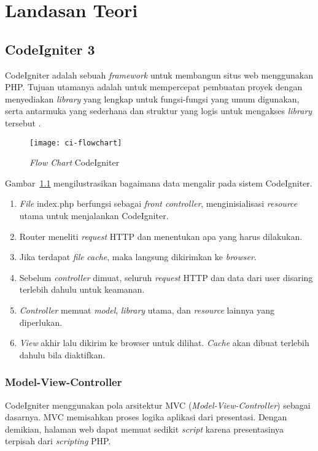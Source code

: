 \chapter{Landasan Teori}
\label{chap:teori}

\section{CodeIgniter 3}
\label{sec:2:codeigniter} 

CodeIgniter adalah sebuah \textit{framework} untuk membangun situs web menggunakan PHP. Tujuan utamanya adalah untuk mempercepat pembuatan proyek dengan menyediakan \textit{library} yang lengkap untuk fungsi-fungsi yang umum digunakan, serta antarmuka yang sederhana dan struktur yang logis untuk mengakses \textit{library} tersebut \cite{codeigniter}.

\begin{figure}[H]
	\centering  
	\texttt{[image: ci-flowchart]}  
	\caption{\textit{Flow Chart} CodeIgniter}
	\label{fig:2:ciflowchart} 
\end{figure} 

Gambar~\ref{fig:2:ciflowchart} mengilustrasikan bagaimana data mengalir pada sistem CodeIgniter.

\begin{enumerate}
	\item \textit{File} index.php berfungsi sebagai \textit{front controller}, menginisialisasi \textit{resource} utama untuk menjalankan CodeIgniter.
	\item Router meneliti \textit{request} HTTP dan menentukan apa yang harus dilakukan.
	\item Jika terdapat \textit{file} \textit{cache}, maka langsung dikirimkan ke \textit{browser}.
	\item Sebelum \textit{controller} dimuat, seluruh \textit{request} HTTP dan data dari user disaring terlebih dahulu untuk keamanan.
	\item \textit{Controller} memuat \textit{model}, \textit{library} utama, dan  \textit{resource} lainnya yang diperlukan.
	\item \textit{View} akhir lalu dikirim ke browser untuk dilihat. \textit{Cache} akan dibuat terlebih dahulu bila diaktifkan. 
\end{enumerate}

\subsection{Model-View-Controller}
\label{subs:2:cimvc} 
CodeIgniter menggunakan pola arsitektur MVC (\textit{Model-View-Controller}) sebagai dasarnya. MVC memisahkan proses logika aplikasi dari presentasi. Dengan demikian, halaman web dapat memuat sedikit \textit{script} karena presentasinya terpisah dari \textit{scripting} PHP.


